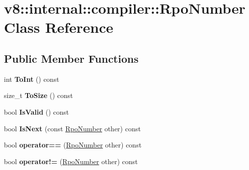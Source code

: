 \hypertarget{classv8_1_1internal_1_1compiler_1_1_rpo_number}{}\section{v8\+:\+:internal\+:\+:compiler\+:\+:Rpo\+Number Class Reference}
\label{classv8_1_1internal_1_1compiler_1_1_rpo_number}
\subsection*{Public Member Functions}
\begin{DoxyCompactItemize}
\item 
int {\bfseries To\+Int} () const \hypertarget{classv8_1_1internal_1_1compiler_1_1_rpo_number_a251eab58907d0b64dacd7153933cb1ce}{}\label{classv8_1_1internal_1_1compiler_1_1_rpo_number_a251eab58907d0b64dacd7153933cb1ce}

\item 
size\+\_\+t {\bfseries To\+Size} () const \hypertarget{classv8_1_1internal_1_1compiler_1_1_rpo_number_a79f8cdc40bf652cd4cc05e8a802cbb31}{}\label{classv8_1_1internal_1_1compiler_1_1_rpo_number_a79f8cdc40bf652cd4cc05e8a802cbb31}

\item 
bool {\bfseries Is\+Valid} () const \hypertarget{classv8_1_1internal_1_1compiler_1_1_rpo_number_a325114f0cf53be4ec841b39062261048}{}\label{classv8_1_1internal_1_1compiler_1_1_rpo_number_a325114f0cf53be4ec841b39062261048}

\item 
bool {\bfseries Is\+Next} (const \hyperlink{classv8_1_1internal_1_1compiler_1_1_rpo_number}{Rpo\+Number} other) const \hypertarget{classv8_1_1internal_1_1compiler_1_1_rpo_number_a673eb8dc1c353ed9429d271d228eba72}{}\label{classv8_1_1internal_1_1compiler_1_1_rpo_number_a673eb8dc1c353ed9429d271d228eba72}

\item 
bool {\bfseries operator==} (\hyperlink{classv8_1_1internal_1_1compiler_1_1_rpo_number}{Rpo\+Number} other) const \hypertarget{classv8_1_1internal_1_1compiler_1_1_rpo_number_aa58400da315338d515c600a705763ceb}{}\label{classv8_1_1internal_1_1compiler_1_1_rpo_number_aa58400da315338d515c600a705763ceb}

\item 
bool {\bfseries operator!=} (\hyperlink{classv8_1_1internal_1_1compiler_1_1_rpo_number}{Rpo\+Number} other) const \hypertarget{classv8_1_1internal_1_1compiler_1_1_rpo_number_a21b847f012a6e66af354bbbe6741c9ee}{}\label{classv8_1_1internal_1_1compiler_1_1_rpo_number_a21b847f012a6e66af354bbbe6741c9ee}


\end{DoxyCompactItemize}
